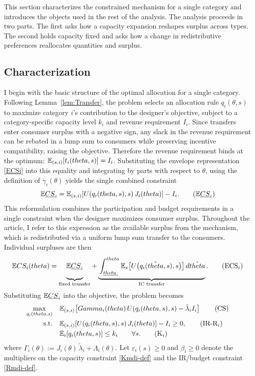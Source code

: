 \documentclass{class}
\begin{document}
This section characterizes the constrained mechanism for a single category and introduces the objects used in the rest of the analysis. The analysis proceeds in two parts. The first asks how a capacity expansion reshapes surplus across types. The second holds capacity fixed and asks how a change in redistributive preferences reallocates quantities and surplus.

\subsection{Characterization}

I begin with the basic structure of the optimal allocation for a single category. Following Lemma~\ref{lem:Transfer}, the problem selects an allocation rule $q_i(\theta,s)$ to maximize category $i$'s contribution to the designer's objective, subject to a category-specific capacity level $k_i$ and revenue requirement $I_i$. Since transfers enter consumer surplus with a negative sign, any slack in the revenue requirement can be rebated in a lump sum to consumers while preserving incentive compatibility, raising the objective. Therefore the revenue requirement binds at the optimum: $\mathbb{E}_{(s,i)}[t_i(theta,s)] = I_i$. Substituting the envelope representation \ref{ECSi} into this equality and integrating by parts with respect to $\theta$, using the definition of $\gamma_i(\theta)$ yields the single combined constraint
\[
\E \underline{CS}_i
=
\E_{(s,i)}\!\left[U\!\left(q_i(\theta,s),s\right) J_i(\theta)\right]-I_i.
\tag{$\E \underline{CS}_i$}\label{underlineECSi}
\]
This reformulation combines the participation and budget requirements in a single constraint when the designer maximizes consumer surplus. Throughout the article, I refer to this expression as the available surplus from the mechanism, which is redistributed via a uniform lump sum transfer to the consumers. Individual surpluses are then 
\[
  \mathbb{E} CS_i(theta) = \underbrace{\Bigg.\mathbb{E}\underline{CS}_i\Bigg.}_{ \text{fixed transfer} } +\underbrace{\Bigg. \int_{\underline{theta}_i}^{theta} \mathbb{E}_s\!\left[U\!\left(q_i(\tilde{theta},s),s\right)\right]d\tilde{theta}\Bigg. }_{\text{IC transfer}}. \tag{ECS$_i$}\label{ECSitimes}
\]
Substituting $\mathbb{E} \underline{CS}_i$ into the objective, the problem becomes
\begin{align*}
\max_{q_i(theta,s)} \quad & \mathbb{E}_{(s,i)}\!\left[Gamma_i(theta)\,U\!\left(q_i(theta,s),s\right)-\tilde\lambda_i I_i\right]
\label{CSmdi-def}\tag{CS} \\
\text{s.t.}\quad &
\mathbb{E}_{(s,i)}\!\left[U\!\left(q_i(theta,s),s\right) J_i(theta)\right]-I_i \ge 0,
\label{Rmdi-def}\tag{IR-R$_i$} \\
& \mathbb{E}_{i}\!\left[q_i(theta,s)\right]\le k_i \qquad \forall s.
\label{Kmdi-def}\tag{K$_i$}
\end{align*}
where $\Gamma_i(\theta) :=  J_i(\theta)\,\tilde \lambda_i + \Lambda_i(\theta)$. Let $\varepsilon_i(s)\ge 0$ and $\beta_i\ge 0$ denote the multipliers on the capacity constraint \ref{Kmdi-def} and the IR/budget constraint \ref{Rmdi-def}.
\end{document}
